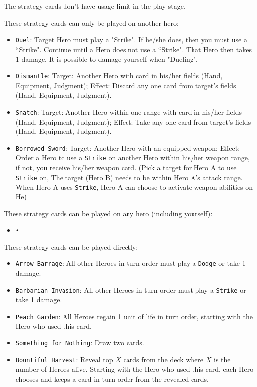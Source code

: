 \documentclass[11pt,a4paper]{article}
\begin{document}
The strategy cards don't have usage limit in the play stage. \bigskip

These strategy cards can only be played on another hero:
\begin{itemize}
\item \texttt{Duel}: Target Hero must play a "Strike". If he/she does, then you must use a ``Strike". Continue until a Hero does not use a ``Strike". That Hero then takes 1 damage. It is possible to damage yourself when "Dueling".
\item \texttt{Dismantle}: Target: Another Hero with card in his/her fields (Hand, Equipment, Judgment);
Effect: Discard any one card from target's fields (Hand, Equipment, Judgment).
\item \texttt{Snatch}: Target: Another Hero within one range with card in his/her fields (Hand, Equipment, Judgment);
Effect: Take any one card from target's fields (Hand, Equipment, Judgment).
\item \texttt{Borrowed Sword}: Target: Another Hero with an equipped weapon; Effect: Order a Hero to use a \texttt{Strike} on another Hero within his/her weapon range, if not, you receive his/her weapon card. (Pick a target for Hero A to use \texttt{Strike} on, The target (Hero B) needs to be within Hero A's attack range. When Hero A uses \texttt{Strike}, Hero A can choose to activate weapon abilities on He)

\end{itemize}

These strategy cards can be played on any hero (including yourself):
\begin{itemize}
\item \texttt{•}
\end{itemize}

These strategy cards can be played directly:
\begin{itemize}
\item \texttt{Arrow Barrage}: All other Heroes in turn order must play a \texttt{Dodge} or take 1 damage.
\item \texttt{Barbarian Invasion}: All other Heroes in turn order must play a \texttt{Strike} or take 1 damage.
\item \texttt{Peach Garden}: All Heroes regain 1 unit of life in turn order, starting with the Hero who used this card.
\item \texttt{Something for Nothing}: Draw two cards.
\item \texttt{Bountiful Harvest}: Reveal top $X$ cards from the deck where $X$ is the number of Heroes alive. Starting with the Hero who used this card, each Hero chooses and keeps a card in turn order from the revealed cards.
\end{itemize} 
\end{document}

